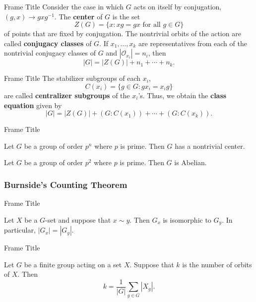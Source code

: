 \documentclass{beamer}
\begin{document}
\begin{frame}{Frame Title}
    \justifying
    Consider the case in which $G$ acts on itself by conjugation, $(g ,x) \to gxg^{-1}$. The \textbf{center} of $G$ is the set
    \[Z(G) = \{x: xg = gx \text{ for all } g \in G\}\]
    of points that are fixed by conjugation. 
    The nontrivial orbits of the action are called \textbf{conjugacy classes} of $G$. If $x_1,\dots,x_k$ are representatives from each of the nontrivial conjugacy classes of $G$ and $|\mathcal{O}_{x_i}| = n_i$, then
    \[|G| = |Z(G)| + n_1 + \cdots + n_k.\]
\end{frame}

\begin{frame}{Frame Title}
    \justifying
    The stabilizer subgroups of each $x_i$,
    \[C(x_i) = \{g \in G : gx_i = x_ig\}\]
    are called \textbf{centralizer subgroups} of the $x_i$'s. Thus, we obtain the \textbf{class equation} given by
    \[|G| = |Z(G)| + (G:C(x_1)) + \cdots + (G:C(x_k)).\]
\end{frame}

\begin{frame}{Frame Title}
    \begin{theorem}
        \justifying
        Let $G$ be a group of order $p^n$ where $p$ is prime. Then $G$ has a nontrivial center.
    \end{theorem}
    \pause
    \begin{corollary}
        Let $G$ be a group of order $p^2$ where $p$ is prime. Then $G$ is Abelian.
    \end{corollary}
\end{frame}

\subsubsection{Burnside's Counting Theorem}

\begin{frame}{Frame Title}
    \begin{lemma}
        \justifying
        Let $X$ be a $G$-set and suppose that $x \sim y$. Then $G_x$ is isomorphic to $G_y$. In particular, $|G_x| =|G_y|$.
    \end{lemma}
\end{frame}

\begin{frame}{Frame Title}
    \begin{theorem}
        \justifying
        Let $G$ be a finite group acting on a set $X$. Suppose that $k$ is the number of orbits of $X$. Then
        \[k = \dfrac{1}{|G|}\sum_{g \in G}|X_g|.\]
    \end{theorem}
\end{frame}
\end{document}
